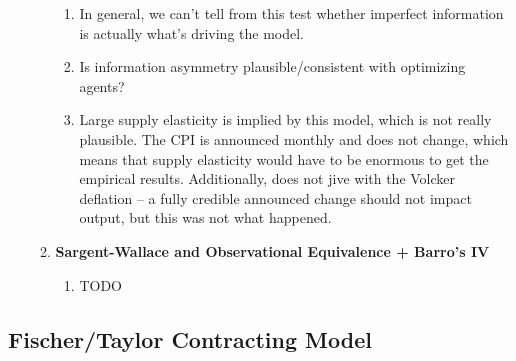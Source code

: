 \documentclass[12pt]{article}
\begin{document}
\begin{itemize}
\begin{enumerate}
\begin{enumerate}
            \item In general, we can't tell from this test whether imperfect information is actually what's driving the model.
            \item Is information asymmetry plausible/consistent with optimizing agents?
            \item Large supply elasticity is implied by this model, which is not really plausible. The CPI is announced monthly and does not change, which means that supply elasticity would have to be enormous to get the empirical results. Additionally, does not jive with the Volcker deflation -- a fully credible announced change should not impact output, but this was not what happened.
        \end{enumerate}
        \item \textbf{Sargent-Wallace and Observational Equivalence + Barro's IV}
        \begin{enumerate}
            \item TODO
        \end{enumerate}
    \end{enumerate}
\end{itemize}

\subsection{Fischer/Taylor Contracting Model}
\end{document}
